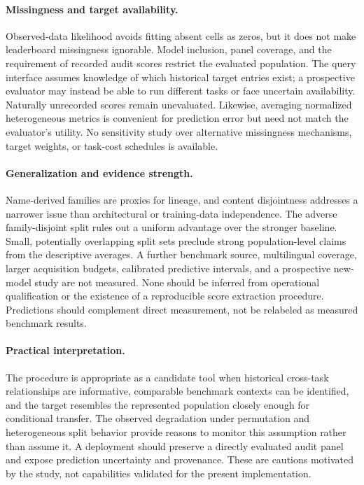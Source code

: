 \documentclass{article}
\begin{document}
\paragraph{Missingness and target availability.}
Observed-data likelihood avoids fitting absent cells as zeros, but it does not make leaderboard missingness ignorable. Model inclusion, panel coverage, and the requirement of recorded audit scores restrict the evaluated population. The query interface assumes knowledge of which historical target entries exist; a prospective evaluator may instead be able to run different tasks or face uncertain availability. Naturally unrecorded scores remain unevaluated. Likewise, averaging normalized heterogeneous metrics is convenient for prediction error but need not match the evaluator's utility. No sensitivity study over alternative missingness mechanisms, target weights, or task-cost schedules is available.

\paragraph{Generalization and evidence strength.}
Name-derived families are proxies for lineage, and content disjointness addresses a narrower issue than architectural or training-data independence. The adverse family-disjoint split rules out a uniform advantage over the stronger baseline. Small, potentially overlapping split sets preclude strong population-level claims from the descriptive averages. A further benchmark source, multilingual coverage, larger acquisition budgets, calibrated predictive intervals, and a prospective new-model study are not measured. None should be inferred from operational qualification or the existence of a reproducible score extraction procedure. Predictions should complement direct measurement, not be relabeled as measured benchmark results.

\paragraph{Practical interpretation.}
The procedure is appropriate as a candidate tool when historical cross-task relationships are informative, comparable benchmark contexts can be identified, and the target resembles the represented population closely enough for conditional transfer. The observed degradation under permutation and heterogeneous split behavior provide reasons to monitor this assumption rather than assume it. A deployment should preserve a directly evaluated audit panel and expose prediction uncertainty and provenance. These are cautions motivated by the study, not capabilities validated for the present implementation.
\end{document}
